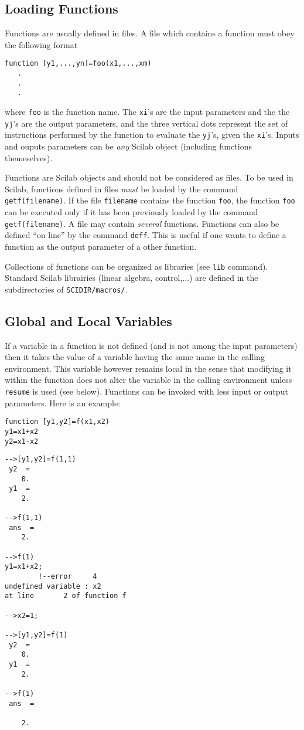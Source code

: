 \subsection{Loading Functions}
Functions are usually defined in files. A file which contains a function
must obey the following format
\begin{verbatim}
function [y1,...,yn]=foo(x1,...,xm)
   .
   .
   .
\end{verbatim}
where {\tt foo} is the function name. The {\tt xi}'s  are the input 
parameters and the the {\tt yj}'s  are the  output parameters, and
the three vertical dots represent the set of instructions performed by
the function to evaluate the {\tt yj}'s, given the {\tt xi}'s.
Inputs and ouputs parameters can be {\it any} Scilab object
(including functions themeselves).

Functions are Scilab objects and should not be considered as files. To
be used in Scilab, functions defined in files  {\em must} be loaded by 
the command {\tt getf(filename)}. If the file {\tt filename} contains the
function {\tt foo}, the function {\tt foo} can be executed only if
it has been previously loaded by the command {\tt getf(filename)}.
A file may contain {\em several} functions. Functions can also be defined ``on line''
by the command {\tt deff}. This is useful if one wants to define
a function as the output parameter of a other function. 

Collections of functions can be organized as libraries (see {\tt lib}
command). Standard Scilab librairies (linear algebra, control,...) 
are defined in the subdirectories of {\tt SCIDIR/macros/}.

\subsection{Global and Local Variables}
If a variable in a function is not defined (and is not among the input
parameters) then it takes the value of a variable having the same name in the
calling environment. This variable however remains local in the sense that
modifying it within the function does not alter the variable in the calling
environment unless {\tt resume} is used (see below). Functions
can be invoked with less input or output parameters. Here is an example:
\begin{verbatim}
function [y1,y2]=f(x1,x2)
y1=x1+x2
y2=x1-x2

\end{verbatim}
\begin{verbatim}
-->[y1,y2]=f(1,1)
 y2  =
    0.  
 y1  =
    2.  

-->f(1,1)
 ans  =
    2.

-->f(1)
y1=x1+x2;
        !--error     4 
undefined variable : x2                      
at line       2 of function f

-->x2=1;

-->[y1,y2]=f(1)
 y2  =
    0.  
 y1  =
    2.  
 
-->f(1)
 ans  =
 
    2. 

\end{verbatim}

